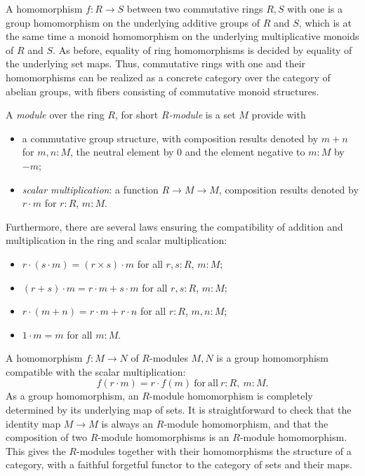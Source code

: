 \documentclass{amsart}
\theoremstyle{plain}
\numberwithin{equation}{section} %
\numberwithin{figure}{section} %
\theoremstyle{plain}
\theoremstyle{plain}
\theoremstyle{plain}
\theoremstyle{plain}
\theoremstyle{plain}
\theoremstyle{plain}
\theoremstyle{remark}
\theoremstyle{remark}
\theoremstyle{remark}
\begin{document}
A homomorphism $f : R \rightarrow S$ between two commutative rings $R, S$ with one is a group homomorphism on the underlying additive groups of $R$ and $S$, which is at the same time a monoid homomorphism on the underlying multiplicative monoids of $R$ and $S$. 
As before, equality of ring homomorphisms is decided by equality of the underlying set maps. Thus, commutative rings with one and their homomorphisms can be realized as a concrete category over the category of abelian groups, with fibers consisting of commutative monoid structures.

A \textit{module} over the ring $R$, for short \textit{$R$-module} is a set $M$ provide with 
\begin{itemize}
\item a commutative group structure, with composition results denoted by $m + n$ for $m, n : M$, the neutral element by $0$ and the element negative to $m : M$ by $-m$;
\item \textit{scalar multiplication}: a function $R \rightarrow M \rightarrow M$, composition results denoted by $r \cdot m$ for $r : R$, $m : M$.
\end{itemize}
Furthermore, there are several laws ensuring the compatibility of addition and multiplication in the ring and scalar multiplication:
\begin{itemize}
\item $r \cdot (s \cdot m) = (r \times s) \cdot m$ for all $r, s : R$, $m : M$;
\item $(r + s) \cdot m = r \cdot m + s \cdot m$ for all $r, s : R$, $m : M$;
\item $r \cdot (m + n) = r \cdot m + r \cdot n$ for all $r : R$, $m, n : M$;
\item $1 \cdot m = m$ for all $m : M$.
\end{itemize}

A homomorphism $f : M \rightarrow N$ of $R$-modules $M, N$ is a group homomorphism compatible with the scalar multiplication:
\[ f(r \cdot m) = r \cdot f(m)\ \mathrm{for\ all\ } r : R,\ m : M. \]
As a group homomorphism, an $R$-module homomorphism is completely determined by its underlying map of sets. It is straightforward to check that the identity map $M \rightarrow M$ is always an $R$-module homomorphism, and that the composition of two $R$-module homomorphisms is an $R$-module homomorphism. 
This gives the $R$-modules together with their homomorphisms the structure of a category, with a faithful forgetful functor to the category of sets and their maps. 
\end{document}
